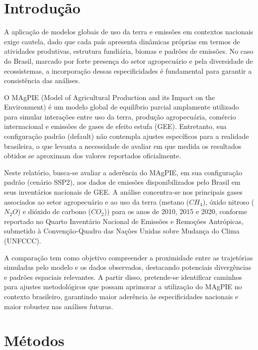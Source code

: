 \documentclass[
]{article}
\begin{document}
\section{Introdução}\label{introduuxe7uxe3o}

A aplicação de modelos globais de uso da terra e emissões em contextos
nacionais exige cautela, dado que cada país apresenta dinâmicas próprias
em termos de atividades produtivas, estrutura fundiária, biomas e
padrões de emissões. No caso do Brasil, marcado por forte presença do
setor agropecuário e pela diversidade de ecossistemas, a incorporação
dessas especificidades é fundamental para garantir a consistência das
análises.

O MAgPIE (Model of Agricultural Production and its Impact on the
Environment) é um modelo global de equilíbrio parcial amplamente
utilizado para simular interações entre uso da terra, produção
agropecuária, comércio internacional e emissões de gases de efeito
estufa (GEE). Entretanto, sua configuração padrão (default) não
contempla ajustes específicos para a realidade brasileira, o que levanta
a necessidade de avaliar em que medida os resultados obtidos se
aproximam dos valores reportados oficialmente.

Neste relatório, busca-se avaliar a aderência do MAgPIE, em sua
configuração padrão (cenário SSP2), aos dados de emissões
disponibilizados pelo Brasil em seus inventários nacionais de GEE. A
análise concentra-se nos principais gases associados ao setor
agropecuário e ao uso da terra (metano (\(CH_4\)), óxido nitroso
(\(N_2 O\)) e dióxido de carbono (\(CO_2\))) para os anos de 2010, 2015
e 2020, conforme reportado no Quarto Inventário Nacional de Emissões e
Remoções Antrópicas, submetido à Convenção-Quadro das Nações Unidas
sobre Mudança do Clima (UNFCCC).

A comparação tem como objetivo compreender a proximidade entre as
trajetórias simuladas pelo modelo e os dados observados, destacando
potenciais divergências e padrões espaciais relevantes. A partir disso,
pretende-se identificar caminhos para ajustes metodológicos que possam
aprimorar a utilização do MAgPIE no contexto brasileiro, garantindo
maior aderência às especificidades nacionais e maior robustez nas
análises futuras.

\section{Métodos}\label{muxe9todos}
\end{document}
